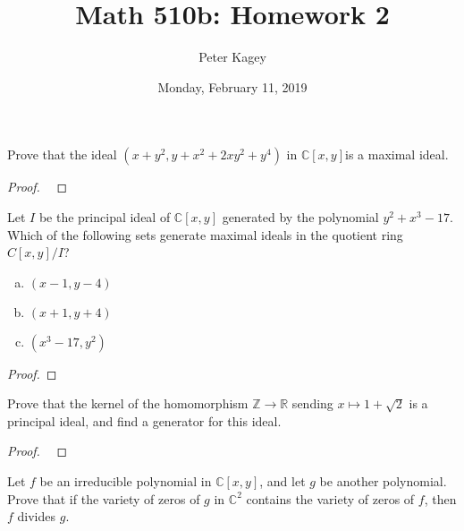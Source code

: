 \documentclass{article}
\newenvironment{problem}[2][Problem]{\begin{trivlist}
\item[\hskip \labelsep {\bfseries #1}\hskip \labelsep {\bfseries #2.}]}{\end{trivlist}}
\begin{document}
\title{Math 510b: Homework 2}
\author{Peter Kagey}
\date{Monday, February 11, 2019}

\maketitle

\begin{problem}{1 (Artin)}
  Prove that the ideal $(x + y^2, y + x^2 + 2xy^2 + y^4)$ in $\mathbb C[x, y]$is a maximal ideal.
\end{problem}

\begin{proof} ~
\end{proof}
\vspace{1cm}
\begin{problem}{2 (Artin)}
  Let $I$ be the principal ideal of $\mathbb C[x, y]$ generated by the
  polynomial $y^2 + x^3 - 17$. Which of the following sets generate maximal
  ideals in the quotient ring $C[x, y]/I$?
  \begin{enumerate}[(a)]
    \item $(x - 1, y - 4)$
    \item $(x + 1, y + 4)$
    \item $(x^3 - 17, y^2)$
  \end{enumerate}
\end{problem}

\begin{proof}
\end{proof}
\pagebreak
\begin{problem}{6 (Artin)}
  Prove that the kernel of the homomorphism $\mathbb Z \rightarrow \mathbb R$
  sending $x \mapsto 1 + \sqrt 2$ is a principal ideal, and find a generator
  for this ideal.
\end{problem}

\begin{proof} ~
\end{proof}
\pagebreak
\begin{problem}{7 (Artin)}
  Let $f$ be an irreducible polynomial in $\mathbb C[x, y]$, and let $g$ be
  another polynomial. Prove that if the variety of zeros of $g$ in $\mathbb C^2$
  contains the variety of zeros of $f$, then $f$ divides $g$.
\end{problem}
\end{document}
